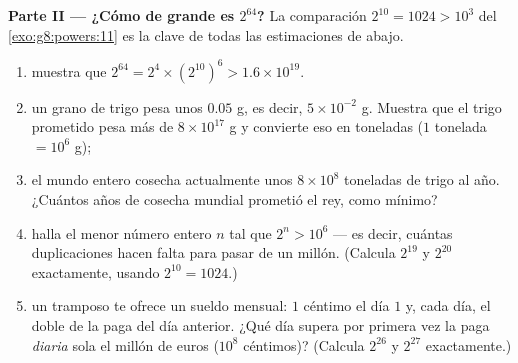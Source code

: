 \begin{problem}[{Problema de fin de semana --- la \omterm{def:g1:addition:def}{suma} geométrica
$1 + 2 + 4 + \dots + 2^{n-1} = 2^n - 1$, de una leyenda famosa a
los números binarios}]
\medskip
\noindent\textbf{Parte II --- ¿Cómo de grande es $2^{64}$?}
La comparación $2^{10} = 1024 > 10^3$ del
\cref{exo:g8:powers:11} es la clave de todas las estimaciones de abajo.
\begin{enumerate}[resume]
  \item muestra que
        $2^{64} = 2^4 \times \left(2^{10}\right)^6 > 1.6 \times
        10^{19}$.
  \item un grano de trigo pesa unos $0.05$ g, es decir,
        $5 \times 10^{-2}$ g. Muestra que el trigo prometido pesa
        más de $8 \times 10^{17}$ g y convierte eso en
        toneladas ($1$ tonelada $= 10^6$ g);
  \item el mundo entero cosecha actualmente unos $8 \times 10^8$
        toneladas de trigo al año. ¿Cuántos años de cosecha
        mundial prometió el rey, como mínimo?
  \item halla el menor número entero $n$ tal que
        $2^n > 10^6$ --- es decir, cuántas duplicaciones hacen falta para
        pasar de un millón. (Calcula $2^{19}$ y $2^{20}$ exactamente,
        usando $2^{10} = 1024$.)
  \item un tramposo te ofrece un sueldo mensual: $1$ céntimo el día
        $1$ y, cada día, el doble de la paga del día anterior. ¿Qué
        día supera por primera vez la paga \emph{diaria} sola el
        millón de euros ($10^8$ céntimos)? (Calcula $2^{26}$ y
        $2^{27}$ exactamente.)
\end{enumerate}


\end{problem}
